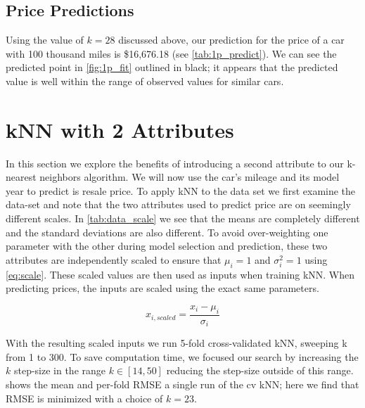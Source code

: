 \documentclass[11pt, fleqn]{article}
\begin{document}
\subsection{Price Predictions}

Using the value of $k=28$ discussed above, our prediction for the price of a car with 100 thousand miles is \$16,676.18 (see \cref{tab:1p_predict}). We can see the predicted point in \cref{fig:1p_fit} outlined in black; it appears that the predicted value is well within the range of observed values for similar cars.



\section{kNN with 2 Attributes}\label{sec:2p}

In this section we explore the benefits of introducing a second attribute to our k-nearest neighbors algorithm. We will now use the car's mileage and its model year to predict is resale price.  To apply kNN to the data set we first examine the data-set and note that the two attributes used to predict price are on seemingly different scales.  In \cref{tab:data_scale} we see that the means are completely different and the standard deviations are also different. To avoid over-weighting one parameter with the other during model selection and prediction, these two attributes are independently scaled to ensure that $\mu_i=1$ and $\sigma_i^2=1$ using \cref{eq:scale}.  These scaled values are then used as inputs when training kNN.  When predicting prices, the inputs are scaled using the exact same parameters.

\begin{equation}\label{eq:scale}
x_{i,scaled} = \frac{x_i-\mu_i}{\sigma_i} 
\end{equation}



With the resulting scaled inputs we run 5-fold cross-validated kNN, sweeping k from 1 to 300.  To save computation time, we focused our search by increasing the $k$ step-size in the range $k\in[14,50]$ reducing the step-size outside of this range.  shows the mean and per-fold RMSE a single run of the cv kNN; here we find that RMSE is minimized with a choice of $k=23$.
\end{document}
